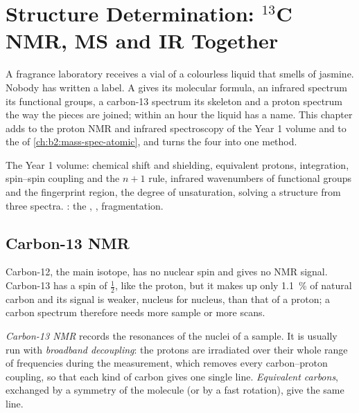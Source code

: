 \chapter{Structure Determination: \texorpdfstring{$^{13}$C}{13C} NMR, MS and IR Together}\label{ch:b2:structure-determination}

A fragrance laboratory receives a vial of a colourless liquid that smells of jasmine. Nobody has
written a label. A  gives its molecular formula, an infrared spectrum its functional
groups, a carbon-13 spectrum its skeleton and a proton spectrum the way the pieces are joined; within an
hour the liquid has a name. This chapter adds  to the proton NMR and infrared spectroscopy
of the Year 1 volume and to the  of \cref{ch:b2:mass-spec-atomic}, and turns the four
into one method.

\begin{recall}
The Year 1 volume: chemical shift and shielding, equivalent protons, integration, spin--spin coupling
and the $n + 1$ rule, infrared wavenumbers of functional groups and the fingerprint region, the degree
of unsaturation, solving a structure from three spectra. : the , , fragmentation.
\end{recall}

\section{Carbon-13 NMR}

Carbon-12, the main isotope, has no nuclear spin and gives no NMR signal. Carbon-13 has a spin of
$\tfrac12$, like the proton, but it makes up only 1.1~\% of natural carbon and its signal is weaker,
nucleus for nucleus, than that of a proton; a carbon spectrum therefore needs more sample or more scans.

\begin{definition}\label{def:b2:structure-determination:c13}
\emph{Carbon-13 NMR} records the resonances of the  nuclei of a sample.
It is usually run with \emph{broadband decoupling}: the protons are
irradiated over their whole range of frequencies during the measurement, which removes every
carbon--proton coupling, so that each kind of carbon gives one single line. \emph{Equivalent
carbons}, exchanged by a symmetry of the molecule (or by a fast rotation),
give the same line.
\end{definition}

